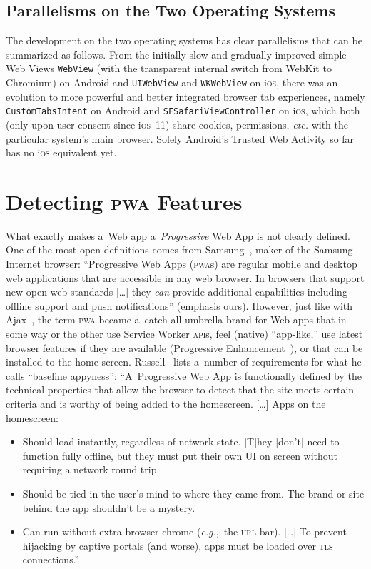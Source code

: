 \documentclass[sigconf]{acmart}
\begin{document}
\subsection{Parallelisms on the Two Operating Systems}

The development on the two operating systems has clear parallelisms
that can be summarized as follows.
From the initially slow and gradually improved simple Web Views \texttt{WebView}
(with the transparent internal switch from WebKit to Chromium)
on Android and \texttt{UIWebView} and \texttt{WKWebView} on i\textsc{os},
there was an evolution to more powerful and better integrated browser tab experiences,
namely \texttt{CustomTabsIntent} on Android and
\texttt{SFSafariViewController} on i\textsc{os},
which both (only upon user consent since i\textsc{os}~11)
share cookies, permissions, \emph{etc.}
with the particular system's main browser.
Solely Android's Trusted Web Activity so far has no i\textsc{os} equivalent yet.

\section{Detecting \textsc{pwa} Features}
\label{sec:pwa-feature-detector}

What exactly makes a~Web app a~\emph{Progressive} Web App is not clearly defined.
One of the most open definitions comes from Samsung~\cite{samsung2017pwa},
maker of the Samsung Internet browser:
``Progressive Web Apps (\textsc{pwa}s) are regular mobile and desktop web applications
that are accessible in any web browser.
In browsers that support new open web standards [\ldots]
they \emph{can} provide additional capabilities
including offline support and push notifications'' (emphasis ours).
However, just like with Ajax~\cite{garret2005ajax}, the term \textsc{pwa}
became a~catch-all umbrella brand for Web apps
that in some way or the other use Service Worker \textsc{api}s,
feel (native) ``app-like,'' use latest browser features if they are available
(Progressive Enhancement~\cite{champeon2003progressiveenhancement}),
or that can be installed to the home screen.
Russell~\cite{russell2016pwa} lists a~number of requirements 
for what he calls ``baseline appyness'':
``A~Progressive Web App is functionally defined by the technical properties
that allow the browser to detect that the site meets certain criteria
and is worthy of being added to the homescreen.
[\ldots]
Apps on the homescreen:

\begin{itemize}
  \item Should load instantly, regardless of network state.
    [T]hey [don't] need to function fully offline,
    but they must put their own UI on screen without requiring a network round trip.
  \item Should be tied in the user's mind to where they came from.
    The brand or site behind the app shouldn't be a mystery.
  \item Can run without extra browser chrome (\emph{e.g.},\ the \textsc{url} bar).
    [\ldots] To prevent hijacking by captive portals (and worse),
    apps must be loaded over \textsc{tls} connections.''
\end{itemize}
\end{document}
